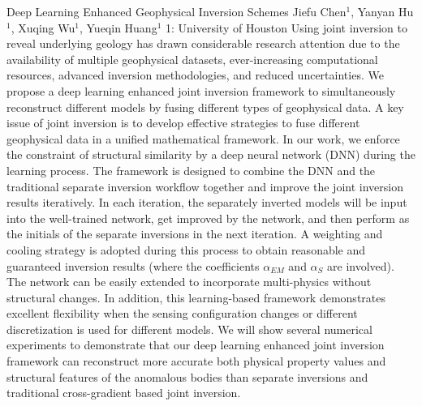 \begin{addmargin}[2em]{0em}
\vspace{1.5ex}
\abs
{Deep Learning Enhanced Geophysical Inversion Schemes}
{Jiefu Chen$^{1}$, Yanyan Hu$^{1}$, Xuqing Wu$^{1}$, Yueqin Huang$^{1}$}
{1: University of Houston}
{Using joint inversion to reveal underlying geology has drawn considerable research attention due to the availability of multiple geophysical datasets, ever-increasing computational resources, advanced inversion methodologies, and reduced uncertainties. We propose a deep learning enhanced joint inversion framework to simultaneously reconstruct different models by fusing different types of geophysical data. A key issue of joint inversion is to develop effective strategies to fuse different geophysical data in a unified mathematical framework. In our work, we enforce the constraint of structural similarity by a deep neural network (DNN) during the learning process. The framework is designed to combine the DNN and the traditional separate inversion workflow together and improve the joint inversion results iteratively. In each iteration, the separately inverted models will be input into the well-trained network, get improved by the network, and then perform as the initials of the separate inversions in the next iteration. A weighting and cooling strategy is adopted during this process to obtain reasonable and guaranteed inversion results (where the coefficients $\alpha_{EM}$ and $\alpha_S$ are involved). The network can be easily extended to incorporate multi-physics without structural changes. In addition, this learning-based framework demonstrates excellent flexibility when the sensing configuration changes or different discretization is used for different models. We will show several numerical experiments to demonstrate that our deep learning enhanced joint inversion framework can reconstruct more accurate both physical property values and structural features of the anomalous bodies than separate inversions and traditional cross-gradient based joint inversion.}



\end{addmargin}
